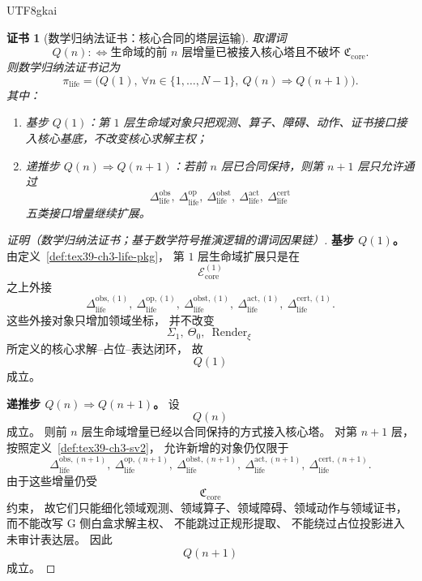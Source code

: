 \documentclass[12pt]{article}
\newtheorem{Certificate}{证书}[section]
\begin{document}
\begin{CJK*}{UTF8}{gkai}
\begin{Certificate}[数学归纳法证书：核心合同的塔层运输]
\label{cert:tex39-ch3-transport}
取谓词
\[
  Q(n)
  :
  \Longleftrightarrow
  \text{生命域的前 }n\text{ 层增量已被接入核心塔且不破坏 }
  \mathfrak C_{\mathrm{core}}.
\]
则数学归纳法证书记为
\[
  \pi_{\mathrm{life}}
  =
  \bigl(
    Q(1),\
    \forall n\in\{1,\dots,N-1\},\
    Q(n)\Rightarrow Q(n+1)
  \bigr).
\]
其中：
\begin{enumerate}
  \item 基步 $Q(1)$：第 $1$ 层生命域对象只把观测、算子、障碍、动作、证书接口接入核心基底，不改变核心求解主权；
  \item 递推步 $Q(n)\Rightarrow Q(n+1)$：若前 $n$ 层已合同保持，则第 $n+1$ 层只允许通过
  \[
    \Delta_{\mathrm{life}}^{\mathrm{obs}},
    \
    \Delta_{\mathrm{life}}^{\mathrm{op}},
    \
    \Delta_{\mathrm{life}}^{\mathrm{obst}},
    \
    \Delta_{\mathrm{life}}^{\mathrm{act}},
    \
    \Delta_{\mathrm{life}}^{\mathrm{cert}}
  \]
  五类接口增量继续扩展。
\end{enumerate}
\end{Certificate}

\begin{proof}[证明（数学归纳法证书；基于数学符号推演逻辑的谓词因果链）]
\textbf{基步 $Q(1)$。}
由定义~\ref{def:tex39-ch3-life-pkg}，
第 $1$ 层生命域扩展只是在
\[
  \mathcal E_{\mathrm{core}}^{(1)}
\]
之上外接
\[
  \Delta_{\mathrm{life}}^{\mathrm{obs},(1)},
  \
  \Delta_{\mathrm{life}}^{\mathrm{op},(1)},
  \
  \Delta_{\mathrm{life}}^{\mathrm{obst},(1)},
  \
  \Delta_{\mathrm{life}}^{\mathrm{act},(1)},
  \
  \Delta_{\mathrm{life}}^{\mathrm{cert},(1)}.
\]
这些外接对象只增加领域坐标，
并不改变
\[
  \Sigma_1,\ \Theta_0,\ \operatorname{Render}_{\xi}
\]
所定义的核心求解--占位--表达闭环，
故
\[
  Q(1)
\]
成立。

\textbf{递推步 $Q(n)\Rightarrow Q(n+1)$。}
设
\[
  Q(n)
\]
成立。
则前 $n$ 层生命域增量已经以合同保持的方式接入核心塔。
对第 $n+1$ 层，按照定义~\ref{def:tex39-ch3-sv2}，
允许新增的对象仍仅限于
\[
  \Delta_{\mathrm{life}}^{\mathrm{obs},(n+1)},
  \
  \Delta_{\mathrm{life}}^{\mathrm{op},(n+1)},
  \
  \Delta_{\mathrm{life}}^{\mathrm{obst},(n+1)},
  \
  \Delta_{\mathrm{life}}^{\mathrm{act},(n+1)},
  \
  \Delta_{\mathrm{life}}^{\mathrm{cert},(n+1)}.
\]
由于这些增量仍受
\[
  \mathfrak C_{\mathrm{core}}
\]
约束，
故它们只能细化领域观测、领域算子、领域障碍、领域动作与领域证书，
而不能改写 G 侧白盒求解主权、
不能跳过正规形提取、
不能绕过占位投影进入未审计表达层。
因此
\[
  Q(n+1)
\]
成立。


\end{proof}
\end{CJK*}
\end{document}
